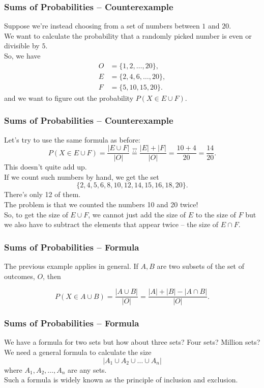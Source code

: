 \documentclass[aspectratio=169,11pt,usenames,dvipsnames]{beamer}
\begin{document}
\begin{frame}
 \frametitle{Sums of Probabilities -- Counterexample}
 Suppose we're instead choosing from a set of numbers between $1$ and
 $20$.\pause\\
 We want to calculate the probability that a randomly picked number is
 \alert{even or divisible by $5$}.\pause\\
 So, we have
 \begin{align*}
  O &= \{1,2,\ldots,20\},\\
  E &= \{2,4,6,\ldots,20\},\\
  F &= \{5,10,15,20\}.
 \end{align*}\pause
 and we want to figure out the probability $P(X \in E \cup F)$.
\end{frame}

\begin{frame}
 \frametitle{Sums of Probabilities -- Counterexample}
 Let's try to use the same formula as before:
 \[
  P(X \in E \cup F) = \frac{|E \cup F|}{|O|} \overset{??}{=} \frac{|E| +
  |F|}{|O|} = \frac{10 + 4}{20} = \frac{14}{20}.
 \]\pause
 This doesn't quite add up.\pause\\
 If we count such numbers by hand, we get the set
 \[
  \{2,4,5,6,8,10,12,14,15,16,18,20\}.
 \]
 \pause
 There's \alert{only 12 of them}.\pause\\
 The problem is that \alert{we counted the numbers 10 and 20 twice}!\pause\\
 So, to get the size of $E \cup F$, we cannot just add the size of $E$ to the
 size of $F$ but we also have to subtract the elements that appear twice -- the
 size of $E \cap F$.
\end{frame}

\begin{frame}
 \frametitle{Sums of Probabilities -- Formula}
 The previous example applies in general. If $A,B$ are two subsets of the set of
 outcomes, $O$, then\pause
 \begin{tcolorbox}
  \[
   P(X \in A \cup B) = \frac{|A \cup B|}{|O|} = \frac{|A| + |B| - |A \cap
   B|}{|O|}.
  \]
 \end{tcolorbox}
\end{frame}

\begin{frame}
 \frametitle{Sums of Probabilities -- Formula}
 We have a formula for two sets but how about three sets? Four sets? Million
 sets?\pause\\
 We need a \alert{general formula} to calculate the size
 \[
  |A_1 \cup A_2 \cup \ldots \cup A_n|
 \]
 where $A_1,A_2,\ldots,A_n$ are any sets.\pause\\
 Such a formula is widely known as the \alert{principle of inclusion and
 exclusion}.
\end{frame}
\end{document}
